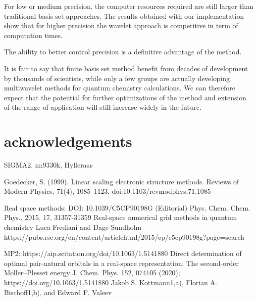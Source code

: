 \documentclass{article}
\begin{document}
For low or medium precision, the computer resources required are still larger than traditional basis set approaches. The results obtained with our implementation show that for higher precision the wavelet approach is competitive in term of computation times.

The ability to better control precision is a definitive advantage of the method. 



It is fair to say that finite basis set method benefit from decades of development by thousands of scientists, while only a few groups are actually developing multiwavelet methods for quantum chemistry calculations. We can therefore expect that the potential for further optimizations of the method and extension of the range of application will still increase widely in the future. %


\section{acknowledgements}
SIGMA2, nn9330k, Hylleraas






Goedecker, S. (1999). Linear scaling electronic structure methods. Reviews of Modern Physics, 71(4), 1085–1123. doi:10.1103/revmodphys.71.1085 

Real space methods:
 DOI: 10.1039/C5CP90198G (Editorial) Phys. Chem. Chem. Phys., 2015, 17, 31357-31359
Real-space numerical grid methods in quantum chemistry
Luca Frediani and Dage Sundholm
https://pubs.rsc.org/en/content/articlehtml/2015/cp/c5cp90198g?page=search



MP2:
https://aip.scitation.org/doi/10.1063/1.5141880
Direct determination of optimal pair-natural orbitals in a real-space representation: The second-order Moller–Plesset energy
 J. Chem. Phys. 152, 074105 (2020); https://doi.org/10.1063/1.5141880
Jakob S. Kottmann1,a), Florian A. Bischoff1,b), and Edward F. Valeev
\end{document}
